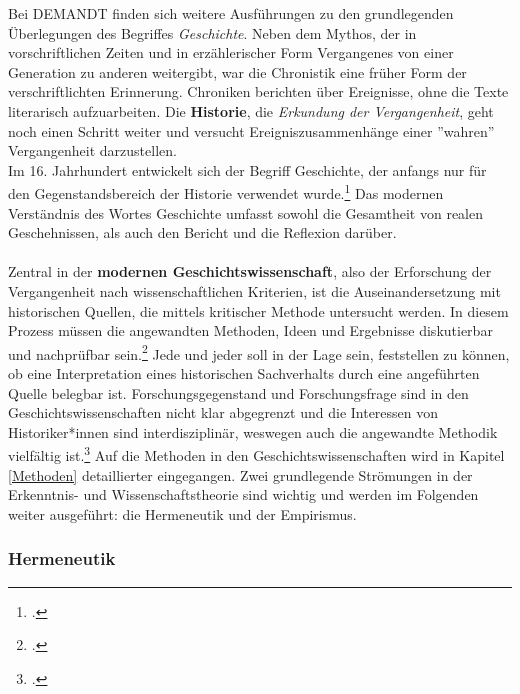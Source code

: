 \documentclass[12pt,a4paper]{article}
\begin{document}
Bei DEMANDT finden sich weitere Ausführungen zu den grundlegenden Überlegungen des Begriffes \textit{Geschichte}. Neben dem Mythos, der in vorschriftlichen Zeiten und in erzählerischer Form Vergangenes von einer Generation zu anderen weitergibt, war die Chronistik eine früher Form der verschriftlichten Erinnerung. Chroniken berichten über Ereignisse, ohne die Texte literarisch aufzuarbeiten. Die \textbf{Historie}, die \textit{Erkundung der Vergangenheit}, geht noch einen Schritt weiter und versucht Ereigniszusammenhänge einer ''wahren'' Vergangenheit darzustellen. 
\\
Im 16. Jahrhundert entwickelt sich der Begriff Geschichte, der anfangs nur für den Gegenstandsbereich der Historie verwendet wurde.\footcite[][S.57-58]{schulz2010neuere} Das modernen Verständnis des Wortes Geschichte umfasst sowohl die Gesamtheit von realen Geschehnissen, als auch den Bericht und die Reflexion darüber.
\\
\\
Zentral in der \textbf{modernen Geschichtswissenschaft}, also der Erforschung der Vergangenheit nach wissenschaftlichen Kriterien, ist die Auseinandersetzung mit historischen Quellen, die mittels kritischer Methode untersucht werden. In diesem Prozess müssen die angewandten Methoden, Ideen und Ergebnisse diskutierbar und nachprüfbar sein.\footcite[][S.13-32]{demand2011philosophie} Jede und jeder soll in der Lage sein, feststellen zu können, ob eine Interpretation eines historischen Sachverhalts durch eine angeführten Quelle belegbar ist. Forschungsgegenstand und Forschungsfrage sind in den Geschichtswissenschaften nicht klar abgegrenzt und die Interessen von Historiker*innen sind interdisziplinär, weswegen auch die angewandte Methodik vielfältig ist.\footcite[][S.13]{reiche2014verfahren} Auf die Methoden in den Geschichtswissenschaften wird in Kapitel \ref{Methoden} detaillierter eingegangen.
Zwei grundlegende Strömungen in der Erkenntnis- und Wissenschaftstheorie sind wichtig und werden im Folgenden weiter ausgeführt: die Hermeneutik und der Empirismus.


\subsubsection{Hermeneutik}
\end{document}
